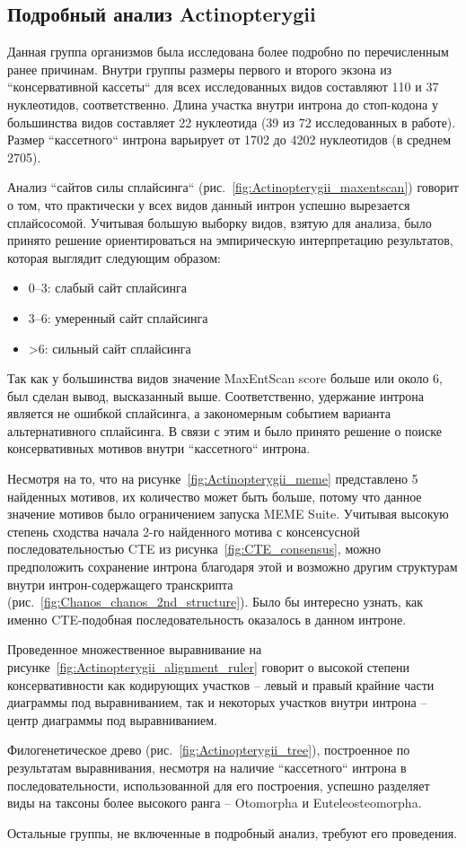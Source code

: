 \subsection{Подробный анализ Actinopterygii}

Данная группа организмов была исследована более подробно по перечисленным ранее причинам.
Внутри группы размеры первого и второго экзона из ``консервативной кассеты`` для всех исследованных видов составляют 110 и 37 нуклеотидов, соответственно.
Длина участка внутри интрона до стоп-кодона у большинства видов составляет 22 нуклеотида (39 из 72 исследованных в работе).
Размер ``кассетного`` интрона варьирует от 1702 до 4202 нуклеотидов (в среднем 2705).

Анализ ``сайтов силы сплайсинга`` (рис.~\ref{fig:Actinopterygii_maxentscan}) говорит о том, что практически у всех видов данный интрон успешно вырезается сплайсосомой.
Учитывая большую выборку видов, взятую для анализа, было принято решение ориентироваться на эмпирическую интерпретацию результатов, которая выглядит следующим образом:

\begin{spacing}{0.5}
\begin{itemize}
    \item 0–3: слабый сайт сплайсинга
    \item 3–6: умеренный сайт сплайсинга
    \item >6: сильный сайт сплайсинга
\end{itemize}
\end{spacing}

Так как у большинства видов значение MaxEntScan score больше или около 6, был сделан вывод, высказанный выше.
Соответственно, удержание интрона является не ошибкой сплайсинга, а закономерным событием варианта альтернативного сплайсинга.
В связи с этим и было принято решение о поиске консервативных мотивов внутри ``кассетного`` интрона.

Несмотря на то, что на рисунке~\ref{fig:Actinopterygii_meme} представлено 5 найденных мотивов, их количество может быть больше, потому что данное значение мотивов было ограничением запуска MEME Suite.
Учитывая высокую степень сходства начала 2-го найденного мотива с консенсусной последовательностью CTE из рисунка~\ref{fig:CTE_consensus}, можно предположить сохранение интрона благодаря этой и возможно другим структурам внутри интрон-содержащего транскрипта (рис.~\ref{fig:Chanos_chanos_2nd_structure}).
Было бы интересно узнать, как именно CTE-подобная последовательность оказалось в данном интроне.

Проведенное множественное выравнивание на рисунке~\ref{fig:Actinopterygii_alignment_ruler} говорит о высокой степени консервативности как кодирующих участков – левый и правый крайние части диаграммы под выравниванием, так и некоторых участков внутри интрона – центр диаграммы под выравниванием.

Филогенетическое древо (рис.~\ref{fig:Actinopterygii_tree}), построенное по результатам выравнивания, несмотря на наличие ``кассетного`` интрона в последовательности, использованной для его построения, успешно разделяет виды на таксоны более высокого ранга – Otomorpha и Euteleosteomorpha.

Остальные группы, не включенные в подробный анализ, требуют его проведения.